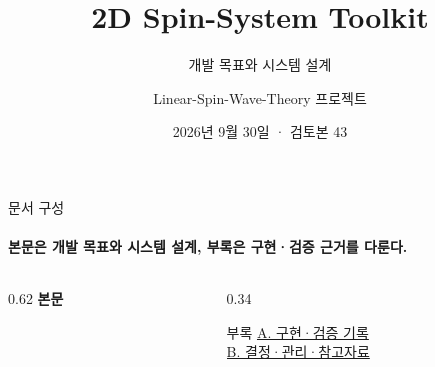 \documentclass[aspectratio=169,10pt]{beamer}
\title{2D Spin-System Toolkit}
\subtitle{개발 목표와 시스템 설계}
\author{Linear-Spin-Wave-Theory 프로젝트}
\institute{공통 모델 정의에서 여러 계산 방법으로}
\date{2026년 9월 30일 · 검토본 43}
\begin{document}
\begin{frame}[plain,noframenumbering,label=cover]
  \titlepage
\end{frame}

\begin{frame}[label=contents]{문서 구성}
  \framesubtitle{본문은 개발 목표와 시스템 설계, 부록은 구현·검증 근거를 다룬다.}
  \begin{columns}[T,onlytextwidth]
    \begin{column}{0.62\textwidth}
      \textbf{본문}\par\medskip
      \tableofcontents[hideallsubsections]
    \end{column}
    \begin{column}{0.34\textwidth}
      \begin{block}{부록}
        \hyperlink{appendix-a}{A. 구현·검증 기록}\\[0.8em]
        \hyperlink{appendix-b}{B. 결정·관리·참고자료}
      \end{block}
    \end{column}
  \end{columns}
  \par\medskip
\end{frame}







\appendix



\end{document}
